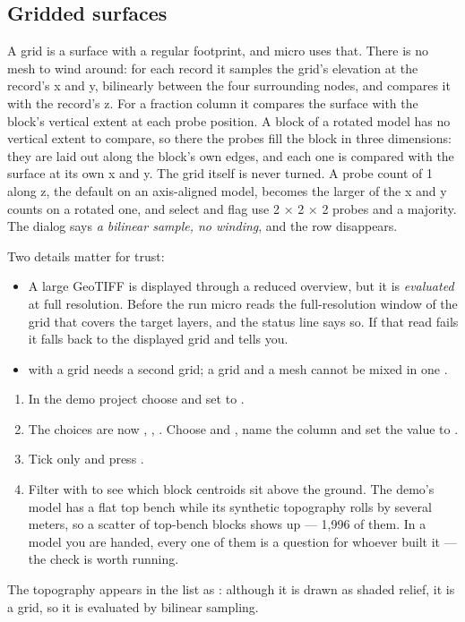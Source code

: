 \subsection{Gridded surfaces}

A grid is a surface with a regular footprint, and micro uses that. There is no mesh to wind around: for each record it samples the grid's elevation at the record's x and y, bilinearly between the four surrounding nodes, and compares it with the record's z. For a fraction column it compares the surface with the block's vertical extent at each probe position. A block of a rotated model has no vertical extent to compare, so there the probes fill the block in three dimensions: they are laid out along the block's own edges, and each one is compared with the surface at its own x and y. The grid itself is never turned. A probe count of 1 along z, the default on an axis-aligned model, becomes the larger of the x and y counts on a rotated one, and select and flag use 2 × 2 × 2 probes and a majority. The dialog says \emph{a bilinear sample, no winding}, and the  row disappears.

Two details matter for trust:

\begin{itemize}
\item A large GeoTIFF is displayed through a reduced overview, but it is \emph{evaluated} at full resolution. Before the run micro reads the full-resolution window of the grid that covers the target layers, and the status line says so. If that read fails it falls back to the displayed grid and tells you.
\item {} with a grid needs a second grid; a grid and a mesh cannot be mixed in one .
\end{itemize}

\begin{tryit}
\begin{enumerate}
\item In the demo project choose  and set  to .
\item The choices are now , , . Choose  and , name the column  and set the value to .
\item Tick  only and press .
\item Filter with  to see which block centroids sit above the ground. The demo's model has a flat top bench while its synthetic topography rolls by several meters, so a scatter of top-bench blocks shows up — 1,996 of them. In a model you are handed, every one of them is a question for whoever built it — the check is worth running.
\end{enumerate}
The topography appears in the list as : although it is drawn as shaded relief, it is a grid, so it is evaluated by bilinear sampling.
\end{tryit}

